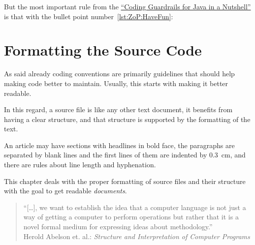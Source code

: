 \documentclass[11pt,a4paper, titlepage, parskip=half, headsepline, footsepline, cleardoublepage=current, headheight=1cm]{scrbook}
\newcommand*{\ngref}{\hyperref[lst:NutshellGuardrails]{“Coding Guardrails for Java in a Nutshell”}}
\begin{document}
But the most important rule from the \ngref{} is that with the bullet point number~\ref{lst:ZoP:HaveFun}:

\begin{center}
	\begin{huge}
	\end{huge}
\end{center}


\chapter{Formatting the Source Code}\label{sec:FormattingTheSourceCode}
As said already coding conventions are primarily guidelines that should help making code better to maintain. Usually, this starts with making it better readable.

In this regard, a source file is like any other text document, it benefits from having a clear structure, and that structure is supported by the formatting of the text.

An article may have sections with headlines in bold face, the paragraphs are separated by blank lines and the first lines of them are indented by 0.3~cm, and there are rules about line length and hyphenation.

This chapter deals with the proper formatting of source files and their structure with the goal to get readable \textit{documents}.

\begin{quote}
“[…], we want to establish the idea that a computer language is not just a way of getting a computer to perform operations but rather that it is a novel formal medium for expressing ideas
about methodology.”\\
Herold Abelson et. al.: \textit{Structure and Interpretation of Computer Programs}
\autocite{Sussman:StructureAndInterpretationOfComputerPrograms}
\end{quote}
\end{document}
